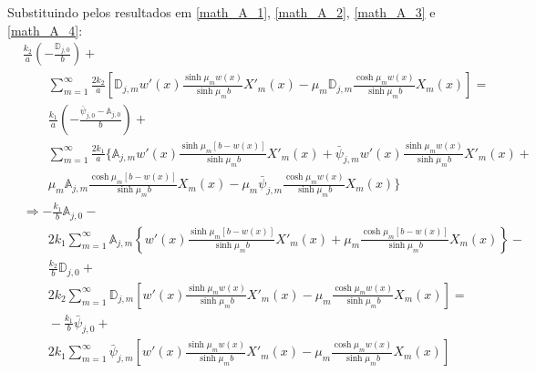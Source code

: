 Substituindo pelos resultados em \eqref{math_A_1}, \eqref{math_A_2}, \eqref{math_A_3} e \eqref{math_A_4}:
\begin{align}
& \frac{k_2}{a} \left( -  \frac{\mathbb{D}_{j,0}}{b} \right) + \nonumber \\
& \quad\quad \sum_{m=1}^\infty \frac{2k_2}{a} \left[\mathbb{D}_{j,m} w'(x) \frac{\sinh\mu_m w(x)}{\sinh\mu_m b}  X'_m(x) - \mu_m\mathbb{D}_{j,m}\frac{\cosh\mu_m w(x)}{\sinh\mu_m b} X_m(x) \right] = \nonumber \\
& \quad\quad \frac{k_1}{a} \left( - \frac{\bar{\psi}_{j,0} - \mathbb{A}_{j,0}}{b} \right) + \nonumber \\
& \quad\quad \sum_{m=1}^\infty \frac{2k_1}{a} \Bigg\{\mathbb{A}_{j,m}w'(x)\frac{\sinh\mu_m [b - w(x)]}{\sinh\mu_m b}X'_m(x) + \bar{\psi}_{j, m}w'(x)\frac{\sinh\mu_m w(x)}{\sinh\mu_m b}X'_m(x) + \nonumber \\
& \quad\quad \mu_m\mathbb{A}_{j,m}\frac{\cosh\mu_m [b - w(x)]}{\sinh\mu_m b}X_m(x) - \mu_m\bar{\psi}_{j, m}\frac{\cosh\mu_m w(x)}{\sinh\mu_m b}X_m(x) \Bigg\} \nonumber \\
%
& \Rightarrow 
-  \frac{k_1}{b}\mathbb{A}_{j,0} - \nonumber \\
& \quad\quad 2k_1 \sum_{m=1}^\infty \mathbb{A}_{j,m} \left\lbrace w'(x)\frac{\sinh\mu_m [b - w(x)]}{\sinh\mu_m b}X'_m(x) +   \mu_m\frac{\cosh\mu_m [b - w(x)]}{\sinh\mu_m b}X_m(x)\right\rbrace - \nonumber \\
&  \quad\quad \frac{k_2}{b}\mathbb{D}_{j,0} + \nonumber \\
& \quad\quad 2k_2\sum_{m=1}^\infty  \mathbb{D}_{j,m}\left[ w'(x) \frac{\sinh\mu_m w(x)}{\sinh\mu_m b}  X'_m(x) - \mu_m\frac{\cosh\mu_m w(x)}{\sinh\mu_m b} X_m(x) \right]  = \nonumber \\
& \quad\quad -\frac{k_1}{b}\bar{\psi}_{j,0} + \nonumber \\
& \quad\quad  2k_1 \sum_{m=1}^\infty \bar{\psi}_{j, m}\left[ w'(x)\frac{\sinh\mu_m w(x)}{\sinh\mu_m b}X'_m(x) -  \mu_m\frac{\cosh\mu_m w(x)}{\sinh\mu_m b}X_m(x)\right]
\end{align}


